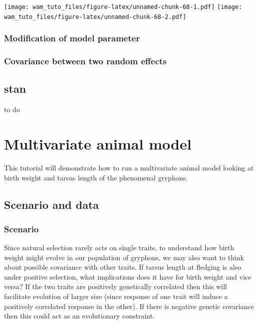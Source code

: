 \documentclass[
  12pt,
]{book}
\begin{document}
\texttt{[image: wam\_tuto\_files/figure-latex/unnamed-chunk-68-1.pdf]} \texttt{[image: wam\_tuto\_files/figure-latex/unnamed-chunk-68-2.pdf]}

\hypertarget{modification-of-model-parameter-1}{%
\subsection{Modification of model parameter}\label{modification-of-model-parameter-1}}

\hypertarget{covariance-between-two-random-effects-2}{%
\subsection{Covariance between two random effects}\label{covariance-between-two-random-effects-2}}

\hypertarget{stan}{%
\section{stan}\label{stan}}

to do

\hypertarget{multivariate-animal-model}{%
\chapter{Multivariate animal model}\label{multivariate-animal-model}}

This tutorial will demonstrate how to run a multivariate animal model looking at birth weight and tarsus length of the phenomenal gryphons.

\hypertarget{scenario-and-data-1}{%
\section{Scenario and data}\label{scenario-and-data-1}}

\hypertarget{scenario-1}{%
\subsection{Scenario}\label{scenario-1}}

Since natural selection rarely acts on single traits, to understand how birth weight might evolve in our population of gryphons, we may also want to think about possible covariance with other traits. If tarsus length at fledging is also under positive selection, what implications does it have for birth weight and vice versa? If the two traits are positively genetically correlated then this will facilitate evolution of larger size (since response of one trait will induce a positively correlated response in the other). If there is negative genetic covariance then this could act as an evolutionary constraint.
\end{document}
